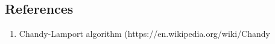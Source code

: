 \subsection{References}
\begin{enumerate}
    \item Chandy-Lamport algorithm (https://en.wikipedia.org/wiki/Chandy%
\end{enumerate}